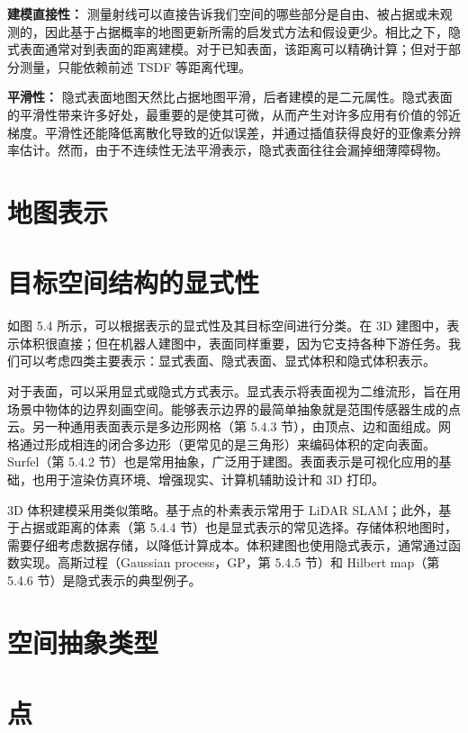 \textbf{建模直接性：} 测量射线可以直接告诉我们空间的哪些部分是自由、被占据或未观测的，因此基于占据概率的地图更新所需的启发式方法和假设更少。相比之下，隐式表面通常对到表面的距离建模。对于已知表面，该距离可以精确计算；但对于部分测量，只能依赖前述 TSDF 等距离代理。

\textbf{平滑性：} 隐式表面地图天然比占据地图平滑，后者建模的是二元属性。隐式表面的平滑性带来许多好处，最重要的是使其可微，从而产生对许多应用有价值的邻近梯度。平滑性还能降低离散化导致的近似误差，并通过插值获得良好的亚像素分辨率估计。然而，由于不连续性无法平滑表示，隐式表面往往会漏掉细薄障碍物。

\section{地图表示}

\section{目标空间结构的显式性}

如图 5.4 所示，可以根据表示的显式性及其目标空间进行分类。在 3D 建图中，表示体积很直接；但在机器人建图中，表面同样重要，因为它支持各种下游任务。我们可以考虑四类主要表示：显式表面、隐式表面、显式体积和隐式体积表示。

对于表面，可以采用显式或隐式方式表示。显式表示将表面视为二维流形，旨在用场景中物体的边界刻画空间。能够表示边界的最简单抽象就是范围传感器生成的点云。另一种通用表面表示是多边形网格（第 5.4.3 节），由顶点、边和面组成。网格通过形成相连的闭合多边形（更常见的是三角形）来编码体积的定向表面。Surfel（第 5.4.2 节）也是常用抽象，广泛用于建图。表面表示是可视化应用的基础，也用于渲染仿真环境、增强现实、计算机辅助设计和 3D 打印。

3D 体积建模采用类似策略。基于点的朴素表示常用于 LiDAR SLAM；此外，基于占据或距离的体素（第 5.4.4 节）也是显式表示的常见选择。存储体积地图时，需要仔细考虑数据存储，以降低计算成本。体积建图也使用隐式表示，通常通过函数实现。高斯过程（Gaussian process，GP，第 5.4.5 节）和 Hilbert map（第 5.4.6 节）是隐式表示的典型例子。

\section{空间抽象类型}

\section{点}

